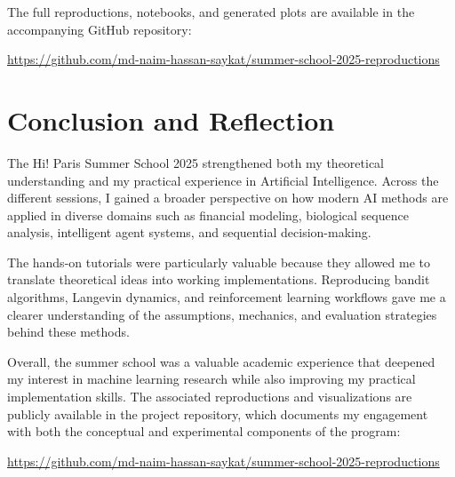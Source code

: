 \documentclass[11pt,a4paper]{article}
\begin{document}
The full reproductions, notebooks, and generated plots are available in the accompanying GitHub repository:

\begin{center}
\url{https://github.com/md-naim-hassan-saykat/summer-school-2025-reproductions}
\end{center}

\section{Conclusion and Reflection}
The Hi! Paris Summer School 2025 strengthened both my theoretical understanding and my practical experience in Artificial Intelligence. Across the different sessions, I gained a broader perspective on how modern AI methods are applied in diverse domains such as financial modeling, biological sequence analysis, intelligent agent systems, and sequential decision-making.

The hands-on tutorials were particularly valuable because they allowed me to translate theoretical ideas into working implementations. Reproducing bandit algorithms, Langevin dynamics, and reinforcement learning workflows gave me a clearer understanding of the assumptions, mechanics, and evaluation strategies behind these methods.

Overall, the summer school was a valuable academic experience that deepened my interest in machine learning research while also improving my practical implementation skills. The associated reproductions and visualizations are publicly available in the project repository, which documents my engagement with both the conceptual and experimental components of the program:

\begin{center}
\url{https://github.com/md-naim-hassan-saykat/summer-school-2025-reproductions}
\end{center}
\end{document}
